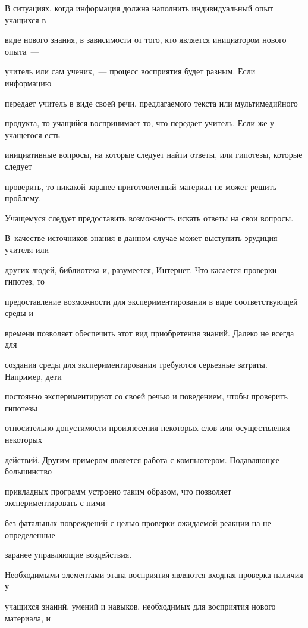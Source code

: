 В ситуациях, когда информация должна наполнить индивидуальный опыт учащихся в 


виде нового знания, в зависимости от того, кто является инициатором нового опыта~--- 


учитель или сам ученик,~--- процесс восприятия будет разным. Если информацию 


передает учитель в виде своей речи, предлагаемого текста или мультимедийного 


продукта, то учащийся воспринимает то, что передает учитель. Если же у учащегося есть 


инициативные вопросы, на которые следует найти ответы, или гипотезы, которые следует 


проверить, то никакой заранее приготовленный материал не может решить проблему. 


Учащемуся следует предоставить возможность искать ответы на свои вопросы. 


В~качестве источников знания в данном случае может выступить эрудиция учителя или 


других людей, библиотека и, разумеется, Интернет. Что касается проверки гипотез, то 


предоставление возможности для экспериментирования в виде соответствующей среды и 


времени позволяет обеспечить этот вид приобретения знаний. Далеко не всегда для 


создания среды для экспериментирования требуются серьезные затраты. Например, дети 


постоянно экспериментируют со своей речью и поведением, чтобы проверить гипотезы 


относительно допустимости произнесения некоторых слов или осуществления некоторых 


действий. Другим примером является работа с компьютером. Подавляющее большинство 


прикладных программ устроено таким образом, что позволяет экспериментировать с ними 


без фатальных повреждений с целью проверки ожидаемой реакции на не определенные 


заранее управляющие воздействия.





Необходимыми элементами этапа восприятия являются входная проверка наличия у 


учащихся знаний, умений и навыков, необходимых для восприятия нового материала, и 


